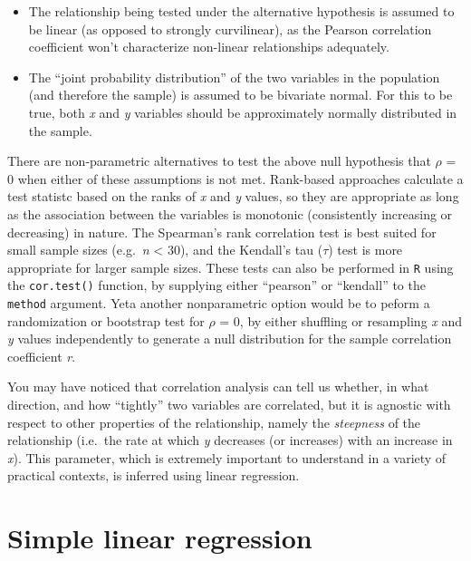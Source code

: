 \documentclass[
]{book}
\begin{document}
\begin{itemize}
\item
  The relationship being tested under the alternative hypothesis is assumed to be linear (as opposed to strongly curvilinear), as the Pearson correlation coefficient won't characterize non-linear relationships adequately.
\item
  The ``joint probability distribution'' of the two variables in the population (and therefore the sample) is assumed to be bivariate normal. For this to be true, both \emph{x} and \emph{y} variables should be approximately normally distributed in the sample.
\end{itemize}

There are non-parametric alternatives to test the above null hypothesis that \(\rho\) = 0 when either of these assumptions is not met. Rank-based approaches calculate a test statistc based on the ranks of \emph{x} and \emph{y} values, so they are appropriate as long as the association between the variables is monotonic (consistently increasing or decreasing) in nature. The Spearman's rank correlation test is best suited for small sample sizes (e.g.~\emph{n} \textless{} 30), and the Kendall's tau (\(\tau\)) test is more appropriate for larger sample sizes. These tests can also be performed in \texttt{R} using the \texttt{cor.test()} function, by supplying either ``pearson'' or ``kendall'' to the \texttt{method} argument. Yeta another nonparametric option would be to peform a randomization or bootstrap test for \(\rho\) = 0, by either shuffling or resampling \emph{x} and \emph{y} values independently to generate a null distribution for the sample correlation coefficient \emph{r}.

You may have noticed that correlation analysis can tell us whether, in what direction, and how ``tightly'' two variables are correlated, but it is agnostic with respect to other properties of the relationship, namely the \emph{steepness} of the relationship (i.e.~the rate at which \emph{y} decreases (or increases) with an increase in \emph{x}). This parameter, which is extremely important to understand in a variety of practical contexts, is inferred using linear regression.

\hypertarget{simple-linear-regression}{%
\section{Simple linear regression}\label{simple-linear-regression}}
\end{document}
